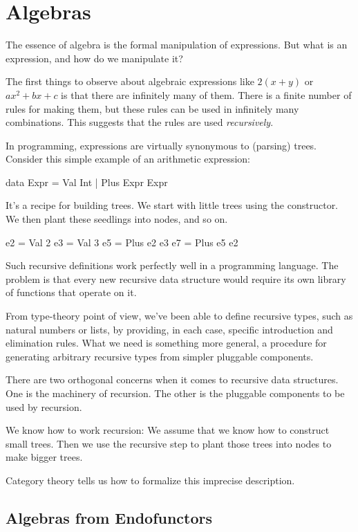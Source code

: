 \documentclass[DaoFP]{subfiles}
\begin{document}
\setcounter{chapter}{11}

\chapter{Algebras}

The essence of algebra is the formal manipulation of expressions. But what is an expression, and how do we manipulate it?

The first things to observe about algebraic expressions like $2 (x + y)$ or $a x^2 + b x + c$ is that there are infinitely many of them. There is a finite number of rules for making them, but these rules can be used in infinitely many combinations. This suggests that the rules are used \emph{recursively}. 


In programming, expressions are virtually synonymous to (parsing) trees. Consider this simple example of an arithmetic expression:
\begin{haskell}
data Expr = Val Int | Plus Expr Expr
\end{haskell}
It's a recipe for building trees. We start with little trees using the  constructor. We then plant these seedlings into nodes, and so on.
\begin{haskell}
e2 = Val 2
e3 = Val 3
e5 = Plus e2 e3
e7 = Plus e5 e2
\end{haskell}

Such recursive definitions work perfectly well in a programming language. The problem is that every new recursive data structure would require its own library of functions that operate on it.

From type-theory point of view, we've been able to define recursive types, such as natural numbers or lists, by providing, in each case, specific introduction and elimination rules. What we need is something more general, a procedure for generating arbitrary recursive types from simpler pluggable components. 

There are two orthogonal concerns when it comes to recursive data structures. One is the machinery of recursion. The other is the pluggable components to be used by recursion. 

We know how to work recursion: We assume that we know how to construct small trees. Then we use the recursive step to plant those trees into nodes to make bigger trees. 

Category theory tells us how to formalize this imprecise description.

\section{Algebras from Endofunctors}
\end{document}
